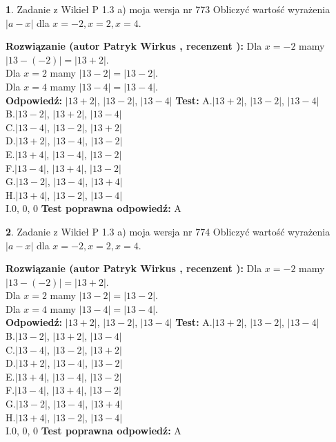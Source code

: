 \documentclass[12pt, a4paper]{article}
\theoremstyle{definition} %
\newtheorem{zad}{}
\newcommand{\zadStart}[1]{\begin{zad}#1\newline}
\newcommand{\zadStop}{\end{zad}}
\newcommand{\rozwStart}[2]{\noindent \textbf{Rozwiązanie (autor #1 , recenzent #2): }\newline}
\newcommand{\rozwStop}{\newline}
\newcommand{\odpStart}{\noindent \textbf{Odpowiedź:}\newline}
\newcommand{\odpStop}{\newline}
\newcommand{\testStart}{\noindent \textbf{Test:}\newline}
\newcommand{\testStop}{\newline}
\newcommand{\kluczStart}{\noindent \textbf{Test poprawna odpowiedź:}\newline}
\newcommand{\kluczStop}{\newline}
\begin{document}
\zadStart{Zadanie z Wikieł P 1.3 a) moja wersja nr 773}
Obliczyć wartość wyrażenia $|a - x|$ dla $x=-2,x=2,x=4$.
\zadStop
\rozwStart{Patryk Wirkus}{}
Dla $x = -2$ mamy $|13 - (-2)| = |13 + 2|$.\\
Dla $x = 2$ mamy $|13 - 2| = |13 - 2|$.\\
Dla $x = 4$ mamy $|13 - 4| = |13 - 4|$.\\
\rozwStop
\odpStart
$|13 + 2|$, $|13 - 2|$, $|13 - 4|$
\odpStop
\testStart
A.$|13 + 2|$, $|13 - 2|$, $|13 - 4|$\\
B.$|13 - 2|$, $|13 + 2|$, $|13 - 4|$\\
C.$|13 - 4|$, $|13 - 2|$, $|13 + 2|$\\
D.$|13 + 2|$, $|13 - 4|$, $|13 - 2|$\\
E.$|13 + 4|$, $|13 - 4|$, $|13 - 2|$\\
F.$|13 - 4|$, $|13 + 4|$, $|13 - 2|$\\
G.$|13 - 2|$, $|13 - 4|$, $|13 + 4|$\\
H.$|13 + 4|$, $|13 - 2|$, $|13 - 4|$\\
I.$0$, $0$, $0$
\testStop
\kluczStart
A
\kluczStop



\zadStart{Zadanie z Wikieł P 1.3 a) moja wersja nr 774}
Obliczyć wartość wyrażenia $|a - x|$ dla $x=-2,x=2,x=4$.
\zadStop
\rozwStart{Patryk Wirkus}{}
Dla $x = -2$ mamy $|13 - (-2)| = |13 + 2|$.\\
Dla $x = 2$ mamy $|13 - 2| = |13 - 2|$.\\
Dla $x = 4$ mamy $|13 - 4| = |13 - 4|$.\\
\rozwStop
\odpStart
$|13 + 2|$, $|13 - 2|$, $|13 - 4|$
\odpStop
\testStart
A.$|13 + 2|$, $|13 - 2|$, $|13 - 4|$\\
B.$|13 - 2|$, $|13 + 2|$, $|13 - 4|$\\
C.$|13 - 4|$, $|13 - 2|$, $|13 + 2|$\\
D.$|13 + 2|$, $|13 - 4|$, $|13 - 2|$\\
E.$|13 + 4|$, $|13 - 4|$, $|13 - 2|$\\
F.$|13 - 4|$, $|13 + 4|$, $|13 - 2|$\\
G.$|13 - 2|$, $|13 - 4|$, $|13 + 4|$\\
H.$|13 + 4|$, $|13 - 2|$, $|13 - 4|$\\
I.$0$, $0$, $0$
\testStop
\kluczStart
A
\kluczStop
\end{document}
